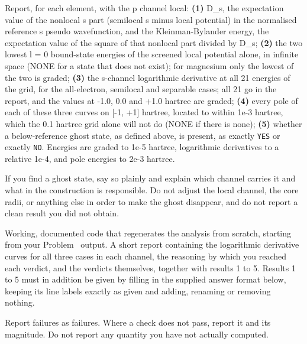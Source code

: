 Report, for each element, with the p channel local:
\textbf{(1)} D\_s, the expectation value of the nonlocal s part (semilocal s minus local potential) in the
normalised reference s pseudo wavefunction, and the Kleinman-Bylander energy, the expectation value of the
square of that nonlocal part divided by D\_s;
\textbf{(2)} the two lowest l = 0 bound-state energies of the screened local potential alone, in infinite space (NONE
for a state that does not exist); for magnesium only the lowest of the two is graded;
\textbf{(3)} the s-channel logarithmic derivative at all 21 energies of the grid, for the all-electron,
semilocal and separable cases; all 21 go in the report, and the values at -1.0, 0.0 and +1.0 hartree are
graded;
\textbf{(4)} every pole of each of these three curves on [-1, +1] hartree, located to within 1e-3 hartree,
which the 0.1 hartree grid alone will not do (NONE if there is none);
\textbf{(5)} whether a below-reference ghost state, as defined above, is present, as exactly \texttt{YES} or exactly \texttt{NO}.
Energies are graded to 1e-5 hartree, logarithmic derivatives to a relative 1e-4, and pole energies to
2e-3 hartree.

If you find a ghost state, say so plainly and explain which channel carries it and what in the construction is
responsible. Do not adjust the local channel, the core radii, or anything else in order to make the ghost
disappear, and do not report a clean result you did not obtain.


Working, documented code that regenerates the analysis from scratch, starting from your Problem~ output. A
short report containing the logarithmic derivative curves for all three cases in each channel, the reasoning
by which you reached each verdict, and the verdicts themselves, together with results 1 to 5. Results 1 to 5 must in addition be given by
filling in the supplied answer format below, keeping its line labels exactly as given and
adding, renaming or removing nothing.

Report failures as failures. Where a check does not pass, report it and its magnitude. Do not report any
quantity you have not actually computed.

